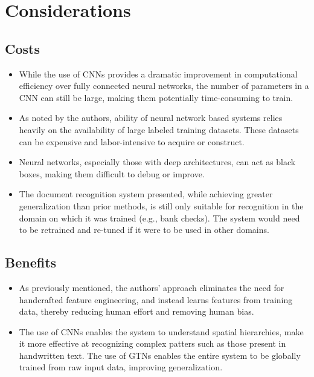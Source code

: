 \documentclass[10pt]{article}
\begin{document}
\section*{Considerations}

\subsection*{Costs}
\begin{itemize}
    \item While the use of CNNs provides a dramatic improvement in computational efficiency over fully connected neural networks, the number of parameters in a CNN can still be large, making them potentially time-consuming to train.

    \item As noted by the authors, ability of neural network based systems relies heavily on the availability of large labeled training datasets. These datasets can be expensive and labor-intensive to acquire or construct.

    \item Neural networks, especially those with deep architectures, can act as black boxes, making them difficult to debug or improve.

    \item The document recognition system presented, while achieving greater generalization than prior methods, is still only suitable for recognition in the domain on which it was trained (e.g., bank checks). The system would need to be retrained and re-tuned if it were to be used in other domains.
\end{itemize}


\subsection*{Benefits}

\begin{itemize}
    \item As previously mentioned, the authors' approach eliminates the need for handcrafted feature engineering, and instead learns features from training data, thereby reducing human effort and removing human bias.

    \item The use of CNNs enables the system to understand spatial hierarchies, make it more effective at recognizing complex patters such as those present in handwritten text. The use of GTNs enables the entire system to be globally trained from raw input data, improving generalization.
\end{itemize}
\end{document}
